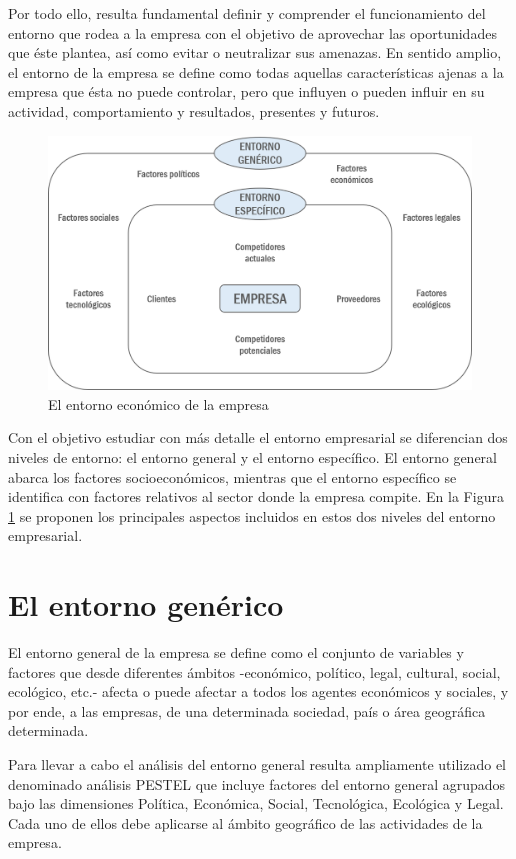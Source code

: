 \documentclass[
]{krantz}
\begin{document}
Por todo ello, resulta fundamental definir y comprender el funcionamiento del entorno que rodea a la empresa con el objetivo de aprovechar las oportunidades que éste plantea, así como evitar o neutralizar sus amenazas. En sentido amplio, el entorno de la empresa se define como todas aquellas características ajenas a la empresa que ésta no puede controlar, pero que influyen o pueden influir en su actividad, comportamiento y resultados, presentes y futuros.

\begin{figure}

{\centering \includegraphics[width=0.5\linewidth]{images/18a-01} 

}

\caption{El entorno económico de la empresa}\label{fig:18a-01}
\end{figure}

Con el objetivo estudiar con más detalle el entorno empresarial se diferencian dos niveles de entorno: el entorno general y el entorno específico. El entorno general abarca los factores socioeconómicos, mientras que el entorno específico se identifica con factores relativos al sector donde la empresa compite. En la Figura \ref{fig:18a-01} se proponen los principales aspectos incluidos en estos dos niveles del entorno empresarial.

\hypertarget{el-entorno-genuxe9rico}{%
\section{El entorno genérico}\label{el-entorno-genuxe9rico}}

El entorno general de la empresa se define como el conjunto de variables y factores que desde diferentes ámbitos -económico, político, legal, cultural, social, ecológico, etc.- afecta o puede afectar a todos los agentes económicos y sociales, y por ende, a las empresas, de una determinada sociedad, país o área geográfica determinada.

Para llevar a cabo el análisis del entorno general resulta ampliamente utilizado el denominado análisis PESTEL \citep{johnson2007} que incluye factores del entorno general agrupados bajo las dimensiones Política, Económica, Social, Tecnológica, Ecológica y Legal. Cada uno de ellos debe aplicarse al ámbito geográfico de las actividades de la empresa.
\end{document}
